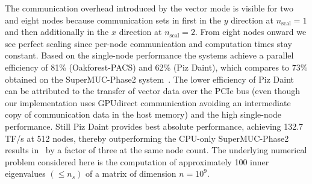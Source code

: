 \documentclass[letterpaper]{llncs}
\newcommand{\OFP}{Oakforest-PACS\xspace}
\begin{document}
The communication overhead introduced by the vector mode is visible
for two and eight nodes because communication sets in first in the $y$
direction at $n_\mathrm{scal}=1$ and then additionally in the $x$
direction at $n_\mathrm{scal}=2$.  From eight nodes onward we see
perfect scaling since per-node communication and computation times
stay constant. Based on the single-node performance the systems
achieve a parallel efficiency of 81\% (\OFP) and 62\% (Piz Daint),
which compares to 73\% obtained on the SuperMUC-Phase2
system~\cite{Pieper15ChebFD}.
The lower efficiency of Piz Daint can be attributed to the transfer of
vector data over the PCIe bus (even though our implementation uses
GPUdirect communication avoiding an intermediate copy of communication
data in the host memory) and the high single-node performance. Still
Piz Daint provides best absolute performance, achieving 132.7\,TF/s
at 512 nodes, thereby outperforming the CPU-only SuperMUC-Phase2
results in~\cite{Pieper15ChebFD} by a factor of three at the same node
count. The underlying numerical problem considered here is the
computation of approximately 100 inner eigenvalues $ (\le n_s)$ of a
matrix of dimension $n=10^9$.

%
        
\end{document}
